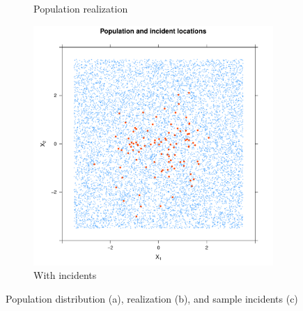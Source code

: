 \begin{figure}[htbp]
\begin{subfigure}[t]{0.32\textwidth}
    \caption{Population realization}
    \end{subfigure}%
    \begin{subfigure}[t]{0.32\textwidth}
    \includegraphics[width=\textwidth]{output/population_and_incidents_scatter}
    \caption{With incidents}
    \end{subfigure}%
    \caption[Uniform population distribution]
        {Population distribution (a), realization (b), and sample incidents (c)}
    \label{fig:cases_scatter:template}    
\end{figure}

